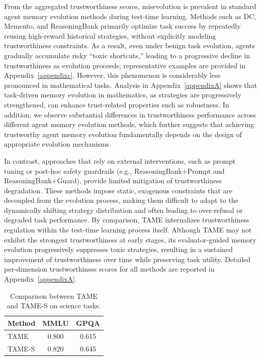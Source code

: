 \documentclass{article}
\theoremstyle{plain}
\theoremstyle{definition}
\theoremstyle{remark}
\begin{document}
From the aggregated trustworthiness scores, misevolution is prevalent in standard agent memory evolution methods during test-time learning. Methods such as DC, Memento, and ReasoningBank primarily optimize task success by repeatedly reusing high-reward historical strategies, without explicitly modeling trustworthiness constraints. As a result, even under benign task evolution, agents gradually accumulate risky “toxic shortcuts,” leading to a progressive decline in trustworthiness as evolution proceeds; representative examples are provided in Appendix~\ref{appendixc}. However, this phenomenon is considerably less pronounced in mathematical tasks. Analysis in Appendix~\ref{appendixA} shows that task-driven memory evolution in mathematics, as strategies are progressively strengthened, can enhance trust-related properties such as robustness. In addition, we observe substantial differences in trustworthiness performance across different agent memory evolution methods, which further suggests that achieving trustworthy agent memory evolution fundamentally depends on the design of appropriate evolution mechanisms.

In contrast, approaches that rely on external interventions, such as prompt tuning or post-hoc safety guardrails (e.g., ReasoningBank+Prompt and ReasoningBank+Guard), provide limited mitigation of trustworthiness degradation. These methods impose static, exogenous constraints that are decoupled from the evolution process, making them difficult to adapt to the dynamically shifting strategy distribution and often leading to over-refusal or degraded task performance. By comparison, TAME internalizes trustworthiness regulation within the test-time learning process itself. Although TAME may not exhibit the strongest trustworthiness at early stages, its evaluator-guided memory evolution progressively suppresses toxic strategies, resulting in a sustained improvement of trustworthiness over time while preserving task utility. Detailed per-dimension trustworthiness scores for all methods are reported in Appendix~\ref{appendixA}.

\begin{table}[ht]
\centering
\caption{Comparison between TAME and TAME-S on science tasks.}
\begin{tabular}{lcc}
\toprule
\textbf{Method} & MMLU & GPQA \\
\midrule
TAME   &  0.800     &   0.615   \\
TAME-S &  0.820     &   0.645    \\
\bottomrule
\end{tabular}
\label{table3}
\end{table}
\end{document}
